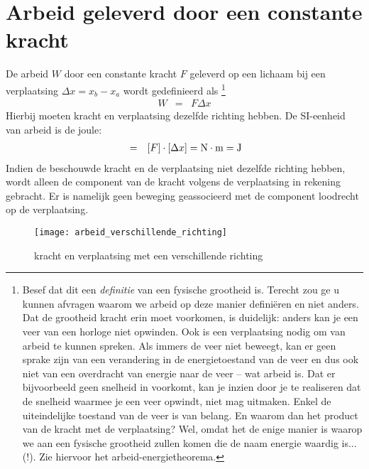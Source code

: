 \documentclass{ximera}
\begin{document}
	
	\section{Arbeid geleverd door een constante kracht}
	
	De arbeid $W$ door een constante kracht $F$ geleverd op een lichaam bij een verplaatsing $\Delta x=x_b-x_a$ wordt gedefinieerd als \footnote{Besef dat dit een \textit{definitie} van een fysische grootheid is. Terecht zou ge u kunnen afvragen waarom we arbeid op deze manier defini\"eren en niet anders. Dat de grootheid kracht erin moet voorkomen, is duidelijk: anders kan je een veer van een horloge niet opwinden. Ook is een verplaatsing nodig om van arbeid te kunnen spreken. Als immers de veer niet beweegt, kan er geen sprake zijn van een verandering in de energietoestand van de veer en dus ook niet van een overdracht van energie naar de veer -- wat arbeid is. Dat er bijvoorbeeld geen snelheid in voorkomt, kan je inzien door je te realiseren dat de snelheid waarmee je een veer opwindt, niet mag uitmaken. Enkel de uiteindelijke toestand van de veer is van belang. En waarom dan het product van de kracht met de verplaatsing? Wel, omdat het de enige manier is waarop we aan een fysische grootheid zullen komen die de naam energie waardig is... (!). Zie hiervoor het arbeid-energietheorema.}
	\begin{eqnarray}
	W&=&F\Delta x
	\end{eqnarray}
	Hierbij moeten kracht en verplaatsing dezelfde richting hebben. De SI-eenheid van arbeid is de joule:
	\begin{eqnarray*}
	[W]&=&[F]\cdot[\Delta x]=\rm N\cdot m=J
	\end{eqnarray*}
	Indien de beschouwde kracht en de verplaatsing niet dezelfde richting hebben, wordt alleen de component van de kracht volgens de verplaatsing in rekening gebracht. Er is namelijk geen beweging geassocieerd met de component loodrecht op de verplaatsing.
	\begin{figure}[h]
	\begin{center}
	\texttt{[image: arbeid\_verschillende\_richting]}
	\caption{kracht en verplaatsing met een verschillende richting}
	\end{center}
	\end{figure}
	
\end{document}
